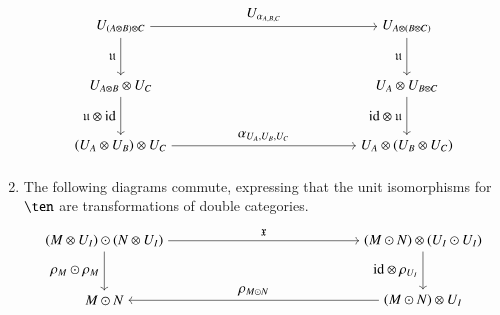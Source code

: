 \begin{enumerate}
        \begin{equation}\label{eq:mondoub5}
\begin{aligned}
\begin{tikzpicture}[xscale=1.8, yscale=1.5]
\node (tl) at (0,2) {$U_{(A \tens B) \tens C}$};
\node (tr) at (4,2) {$U_{A \tens (B \tens C)}$};
\node (ml) at (0,1) {$U_{A \tens B} \tens U_C$};
\node (mr) at (4,1) {$U_A \tens U_{B \tens C}$};
\node (bl) at (0,0) {$(U_A \tens U_B) \tens U_C$};
\node (br) at (4,0) {$U_A \tens (U_B \tens U_C)$};
\draw[->] (tl) to node[above] {$U_{\alpha_{A,B,C}}$} (tr);
\draw[->] (tl) to node[left]{$\fu$} (ml);
\draw[->] (ml) to node[left]{$\fu \tens \id$} (bl);
\draw[->] (tr) to node[left]{$\fu$} (mr);
\draw[->] (mr) to node[left]{$\id \tens \fu$} (br);
\draw[->] (bl) to node[above] {$\alpha_{U_A, U_B, U_C}$} (br);
\end{tikzpicture}
    \end{aligned}
\end{equation}

\item \label{eq:mon3}The following diagrams commute, expressing that the unit
  isomorphisms for $\ten$ are transformations of double categories.
 \begin{equation}\label{eq:mondoub6}
\begin{aligned}
\begin{tikzpicture}[xscale=2, yscale=1.5]
\node (tl) at (0,2) {$(M \tens U_I) \odot (N \tens U_I) $};
\node (tr) at (4,2) {$(M \odot N) \tens ( U_I \odot U_I)$};
\node (ml) at (0,1) {$M \odot N$};
\node (mr) at (4,1) {$(M \odot N) \tens U_I$};
\draw[->] (tl) to node[above] {$\fx$} (tr);
\draw[->] (tl) to node[left]{$\rho_M \odot \rho_M$} (ml);
\draw[->] (tr) to node[left]{$\id \tens \rho_{U_I}$} (mr);
\draw[->] (mr) to node[above] {$\rho_{M \odot N}$} (ml);
\end{tikzpicture}
    \end{aligned}
\end{equation}
      

\end{enumerate}
